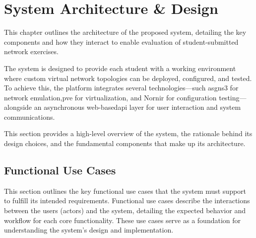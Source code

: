 
\chapter{System Architecture \& Design}


\label{Chapter4SystemArchitectureDesign}


This chapter outlines the architecture of the proposed system, detailing the key components and how they interact to enable 
evaluation of student-submitted network exercises.

The system is designed to provide each student with a working environment where custom virtual network topologies can be 
deployed, configured, and tested. To achieve this, the platform integrates several technologies—such as\ac{gns3} for network 
emulation,\ac{pve} for virtualization, and Nornir for configuration testing—alongside an asynchronous web-based\ac{api} layer for 
user interaction and system communications.

This section provides a high-level overview of the system, the rationale behind its design choices, and the fundamental 
components that make up its architecture.

\section{Functional Use Cases}

    This section outlines the key functional use cases that the system must support to fulfill its intended requirements. 
    Functional use cases describe the interactions between the users (actors) and the system, detailing the expected 
    behavior and workflow for each core functionality. These use cases serve as a foundation for understanding the system's 
    design and implementation.

